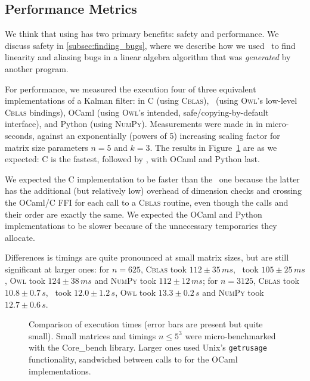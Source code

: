 \subsection{Performance Metrics}


We think that using \lang has two primary benefits: safety and performance. We
discuss safety in \ref{subsec:finding_bugs}, where we describe how we used
\lang\ to find linearity and aliasing bugs in a linear algebra algorithm that
was \emph{generated} by another program.

For performance, we measured the execution four of three equivalent
implementations of a Kalman filter: in C (using \textsc{Cblas}), \lang\ (using
\textsc{Owl}'s low-level \textsc{Cblas} bindings), OCaml (using \textsc{Owl}'s
intended, safe/copying-by-default interface), and Python (using
\textsc{NumPy}).  Measurements were made in in micro-seconds, against an
exponentially (powers of 5) increasing scaling factor for matrix size
parameters $n=5$ and $k=3$. The results in Figure~\ref{fig:timings} are as we
expected: C is the fastest, followed by \lang, with OCaml and Python last.

We expected the C implementation to be faster than the \lang\ one because the
latter has the additional (but relatively low) overhead of dimension checks and
crossing the OCaml/C FFI for each call to a \textsc{Cblas} routine, even though
the calls and their order are exactly the same. We expected the OCaml and
Python implementations to be slower because of the unnecessary temporaries they
allocate.

Differences is timings are quite pronounced at small matrix sizes, but are
still significant at larger ones: for $n=625$, \textsc{Cblas} took $112 \pm
35\, ms$, \lang\ took $105 \pm 25 \, ms$, \textsc{Owl} took $124 \pm 38\, ms$
and \textsc{NumPy} took $112 \pm 12\, ms$;  for $n=3125$, \textsc{Cblas} took
$10.8 \pm 0.7\, s$, \lang\ took $12.0 \pm 1.2 \, s$, \textsc{Owl} took $13.3
\pm 0.2\, s$ and \textsc{NumPy} took $12.7 \pm 0.6\, s$.

\begin{figure}[t]
    \centering
    
    \caption{Comparison of execution times (error bars are present but quite
        small). Small matrices and timings $n \le 5^3$ were micro-benchmarked
        with the Core\_bench library. Larger ones used Unix's
        \texttt{getrusage} functionality, sandwiched between calls to
         for the OCaml implementations.}\label{fig:timings}
\end{figure}


